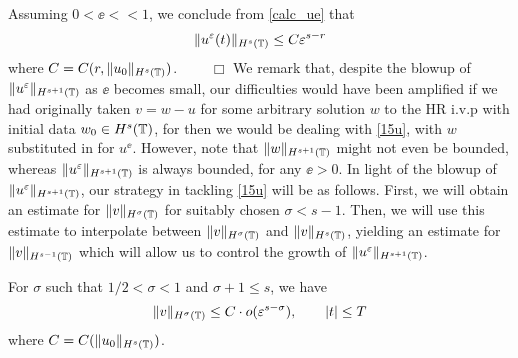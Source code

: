 Assuming $0 < \ee <<1$, we conclude from \eqref{calc_ue} that 
\begin{equation*}
	\begin{split}
		\|u^\varepsilon(t)\|_{H^s(\mathbb{T})} \le C \varepsilon^{s-r}
	\end{split}
\end{equation*}
where $C = C(r, \|u_0\|_{H^s(\mathbb{T})})$. $\qquad \Box$
	We remark that, despite the blowup of $\|u^\varepsilon \|_{H^{s+1}(\mathbb{T})}$
	as $\ee$ becomes small, our difficulties would have been
	amplified if we had originally taken $v=w-u$ for some arbitrary
	solution $w$ to the HR
	i.v.p with initial data $w_0 \in H^s(\mathbb{T})$, for then we would be dealing with
	\eqref{15u}, with $w$ substituted in for $u^\ee$. However, note that 
	$\|w\|_{H^{s+1}(\mathbb{T})}$ might not even be bounded, whereas $\|u^\varepsilon
	\|_{H^{s+1}(\mathbb{T})}$ is always bounded, for any $\ee > 0$.
	In light of the blowup of $\|u^\varepsilon \|_{H^{s+1}(\mathbb{T})}$,
	our strategy in tackling
	\eqref{15u} will be as follows. First, we will obtain an estimate for
	$\|v\|_{H^\sigma(\mathbb{T})}$ for suitably chosen $\sigma < s-1$. Then, we
	will use this estimate to interpolate between $\|v\|_{H^\sigma(\mathbb{T})}$
	and $\|v\|_{H^s(\mathbb{T})}$,
	yielding an estimate for $\|v\|_{H^{s-1}(\mathbb{T})}$ which will allow us to control the growth of
	$\|u^\varepsilon\|_{H^{s+1}(\mathbb{T})}$. 
\begin{lemma} 
	\label{lem6r}
	For $\sigma$ such that $1/2 < \sigma < 1$ and $\sigma + 1 \le s$, we have
	\begin{equation}
	\begin{split}
		\|v\|_{H^{\sigma}(\mathbb{T})} \le C \cdot o(\varepsilon^{s- \sigma }), \qquad |t| \le T
	\end{split}
\end{equation}
where $C=C(\|u_0\|_{H^s(\mathbb{T})})$.
\end{lemma}
%
%
%
